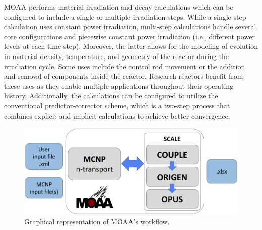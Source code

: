 \documentclass{style/nseJournal}
\begin{document}
MOAA performs material irradiation and decay calculations which can be configured to include a single or multiple irradiation steps.
While a single-step calculation uses constant power irradiation, multi-step calculations handle several core configurations and piecewise constant power irradiation (i.e., different power levels at each time step).
Moreover, the latter allows for the modeling of evolution in material density, temperature, and geometry of the reactor during the irradiation cycle.
Some uses include the control rod movement or the addition and removal of components inside the reactor.
Research reactors benefit from these uses as they enable multiple applications throughout their operating history.
Additionally, the calculations can be configured to utilize the conventional predictor-corrector scheme, which is a two-step process that combines explicit and implicit calculations to achieve better convergence.

\begin{figure}[htbp!]
  \begin{center}
    \includegraphics[width=0.90\linewidth]{figures/diagram_2}
  \end{center}
  \caption{Graphical representation of MOAA's workflow.}
  \label{fig:workflow_1}
\end{figure}


\end{document}
